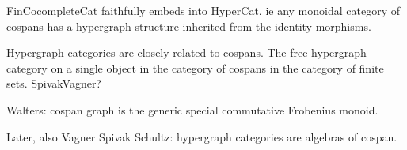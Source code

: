 


  
FinCocompleteCat faithfully embeds into HyperCat. ie any monoidal category of
cospans has a hypergraph structure inherited from the identity morphisms.

  Hypergraph categories are closely related to cospans. The free hypergraph
  category on a single object in the category of cospans in the category of
  finite sets. SpivakVagner?

Walters: cospan graph is the generic special commutative Frobenius monoid.

Later, also Vagner Spivak Schultz: hypergraph categories are algebras of cospan.

